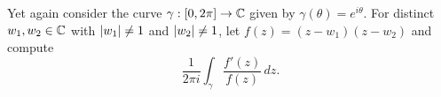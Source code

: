 \documentclass{homework}
\begin{document}
                                                                                        \begin{problem}
                                                                                          Yet again consider the curve $\gamma : [0,2\pi] \to \mathbb{C}$ given by $\gamma(\theta) = e^{i\theta}$.  For distinct $w_1, w_2 \in \mathbb{C}$ with $\left|w_1\right| \neq 1$ and $\left|w_2\right| \neq 1$, let $f(z) = (z - w_1) (z - w_2)$ and compute
                                                                                            \[
                                                                                                \frac{1}{2\pi i} \displaystyle\int_\gamma \frac{f'(z)}{f(z)} \, dz.
                                                                                                  \]
                                                                                                  \end{problem}
\end{document}
